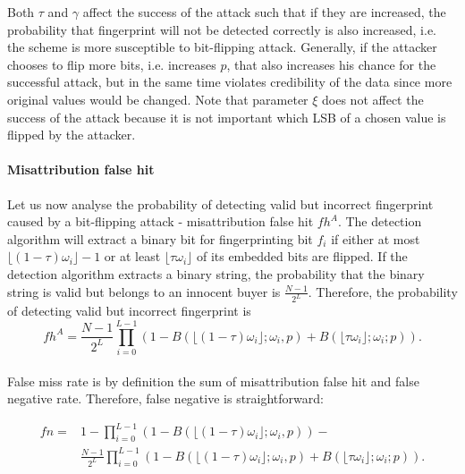 Both $\tau$ and $\gamma$ affect the success of the attack such that if they are increased, the probability that fingerprint will not be detected correctly is also increased, i.e. the scheme is more susceptible to bit-flipping attack.
Generally, if the attacker chooses to flip more bits, i.e. increases $p$, that also increases his chance for the successful attack, but in the same time violates credibility of the data since more original values would be changed.
Note that parameter $\xi$ does not affect the success of the attack because it is not important which LSB of a chosen value is flipped by the attacker. 

\paragraph{Misattribution false hit}
Let us now analyse the probability of detecting valid but incorrect fingerprint caused by a bit-flipping attack - misattribution false hit $fh^A$.
The detection algorithm will extract a binary bit for fingerprinting bit $f_i$ if either at most $\lfloor(1-\tau)\omega_i\rfloor-1$ or at least $\lfloor\tau\omega_i\rfloor$ of its embedded bits are flipped.
If the detection algorithm extracts a binary string, the probability that the binary string is valid but belongs to an innocent buyer is $\frac{N-1}{2^L}$.
Therefore, the probability of detecting valid but incorrect fingerprint is 
\begin{equation} \label{missattribution-false-hit-ak-bit-flipping}
    fh^A=\frac{N-1}{2^L}\prod_{i=0}^{L-1}(1-B(\lfloor(1-\tau)\omega_i\rfloor;\omega_i,p)+B(\lfloor\tau\omega_i\rfloor;\omega_i;p)).
\end{equation}

\paragraph{}
False miss rate is by definition the sum of misattribution false hit and false negative rate.
Therefore, false negative is straightforward:

\begin{equation}
\begin{aligned}
fn=& 1-\prod_{i=0}^{L-1}(1-B(\lfloor(1-\tau)\omega_i\rfloor;\omega_i,p))- \\ & \frac{N-1}{2^L}\prod_{i=0}^{L-1}(1-B(\lfloor(1-\tau)\omega_i\rfloor;\omega_i,p)+B(\lfloor\tau\omega_i\rfloor;\omega_i;p)).
\end{aligned}
\end{equation}

